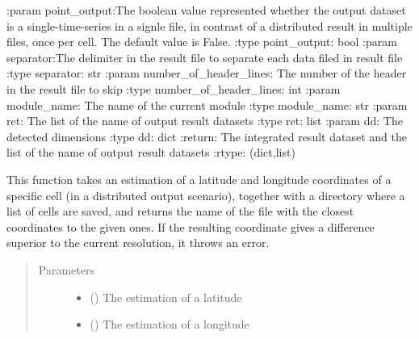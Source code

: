 \documentclass[letterpaper,10pt,english]{sphinxmanual}
\begin{document}
\begin{fulllineitems}
\begin{fulllineitems}
:param point\_output:The boolean value represented whether the output dataset is a single-time-series in a signle file,        in contrast of a distributed result in multiple files, once per cell. The default value is False.
:type point\_output: bool
:param separator:The delimiter in the result file to separate each data filed in result file
:type separator: str
:param number\_of\_header\_lines: The number of the header in the result file to skip
:type number\_of\_header\_lines: int
:param module\_name: The name of the current module
:type module\_name: str
:param ret: The list of the name of output result datasets
:type ret: list
:param dd: The detected dimensions
:type dd: dict
:return: The integrated result dataset and the list of the name of output result datasets
:rtype: (dict,list)

\end{fulllineitems}


\begin{fulllineitems}
\label{\detokenize{AgentTools.util:AgentTools.util.OutputUtil.OutputUtil.search_file_with_closest_lat_lon}}
This function takes an estimation of a latitude and longitude coordinates of a specific cell (in a distributed
output scenario), together with a directory where a list of cells are saved, and returns the name of the file
with the closest coordinates to the given ones. If the resulting coordinate gives a difference superior to the
current resolution, it throws an error.
\begin{quote}\begin{description}
\item[{Parameters}] \leavevmode\begin{itemize}
\item {} 
 () \textendash{} The estimation of a latitude

\item {} 
 () \textendash{} The estimation of a longitude


\end{itemize}
\end{description}
\end{quote}
\end{fulllineitems}
\end{fulllineitems}
\end{document}

